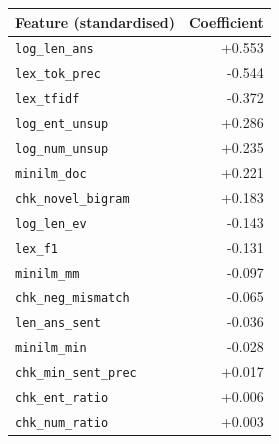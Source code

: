 \begin{tabular}{lr}
\toprule
Feature (standardised) & Coefficient \\
\midrule
\texttt{log\_len\_ans} & +0.553 \\
\texttt{lex\_tok\_prec} & -0.544 \\
\texttt{lex\_tfidf} & -0.372 \\
\texttt{log\_ent\_unsup} & +0.286 \\
\texttt{log\_num\_unsup} & +0.235 \\
\texttt{minilm\_doc} & +0.221 \\
\texttt{chk\_novel\_bigram} & +0.183 \\
\texttt{log\_len\_ev} & -0.143 \\
\texttt{lex\_f1} & -0.131 \\
\texttt{minilm\_mm} & -0.097 \\
\texttt{chk\_neg\_mismatch} & -0.065 \\
\texttt{len\_ans\_sent} & -0.036 \\
\texttt{minilm\_min} & -0.028 \\
\texttt{chk\_min\_sent\_prec} & +0.017 \\
\texttt{chk\_ent\_ratio} & +0.006 \\
\texttt{chk\_num\_ratio} & +0.003 \\
\bottomrule
\end{tabular}
